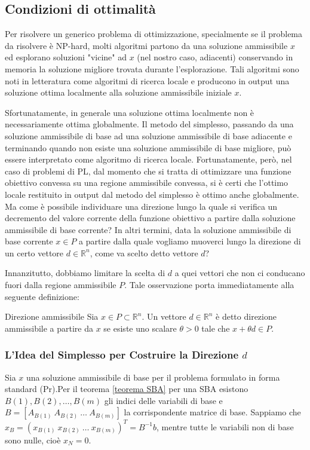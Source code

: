 \subsection{Condizioni di ottimalità}

Per risolvere un generico problema di ottimizzazione, specialmente se il problema da risolvere è NP-hard, molti algoritmi partono da una soluzione ammissibile $x$ ed esplorano soluzioni "vicine" ad $x$ (nel nostro caso, adiacenti) conservando in memoria la soluzione migliore trovata durante l'esplorazione. Tali algoritmi sono noti in letteratura come algoritmi di ricerca locale e producono in output una soluzione ottima localmente alla soluzione ammissibile iniziale $x$.

Sfortunatamente, in generale una soluzione ottima localmente non è necessariamente ottima globalmente. Il metodo del simplesso, passando da una soluzione ammissibile di base ad una soluzione ammissibile di base adiacente e terminando quando non esiste una soluzione ammissibile di base migliore, può essere interpretato come algoritmo di ricerca locale. Fortunatamente, però, nel caso di problemi di PL, dal momento che si tratta di ottimizzare una funzione obiettivo convessa su una regione ammissibile convessa, si è certi che l'ottimo locale restituito in output dal metodo del simplesso è ottimo anche globalmente. Ma come è possibile individuare una direzione lungo la quale si verifica un decremento del valore corrente della funzione obiettivo a partire dalla soluzione ammissibile di base corrente? In altri termini, data la soluzione ammissibile di base corrente $x \in P$ a partire dalla quale vogliamo muoverci lungo la direzione di un certo vettore $d \in \mathbb{R}^n$, come va scelto detto vettore $d$?

Innanzitutto, dobbiamo limitare la scelta di $d$ a quei vettori che non ci conducano fuori dalla regione ammissibile $P$. Tale osservazione porta immediatamente alla seguente definizione:

\begin{definition}{Direzione ammissibile}
Sia $x \in P \subset \mathbb{R}^n$. Un vettore $d \in \mathbb{R}^n$ è detto direzione ammissibile a partire da $x$ se esiste uno scalare $\theta > 0$ tale che $x + \theta d \in P$.
\end{definition}

\subsubsection{L'Idea del Simplesso per Costruire la Direzione $d$}
Sia $x$ una soluzione ammissibile di base per il problema formulato in forma standard (Pr).Per il teorema \ref{teorema SBA} per una SBA esistono $B(1), B(2), \dots, B(m)$ gli indici delle variabili di base e $B = [A_{B(1)} \ A_{B(2)} \ \dots \ A_{B(m)}]$ la corrispondente matrice di base. Sappiamo che $x_B = (x_{B(1)} \ x_{B(2)} \ \dots \ x_{B(m)})^T = B^{-1}b$, mentre tutte le variabili non di base sono nulle, cioè $x_N = 0$.

